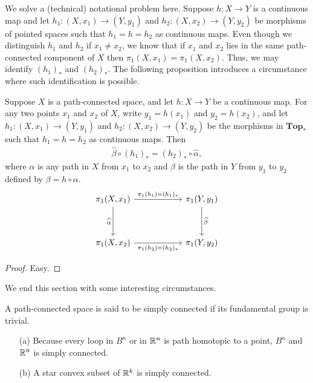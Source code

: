 We solve a (technical) notational problem here.
Suppose $h: X\rightarrow Y$ is a continuous map and let $h_1: (X, x_1)\rightarrow (Y, y_1)$ and $h_2: (X, x_2)\rightarrow (Y, y_2)$ be morphisms of pointed spaces such that $h_1=h=h_2$ as continuous maps.
Even though we distinguish $h_1$ and $h_2$ if $x_1\neq x_2$, we know that if $x_1$ and $x_2$ lies in the same path-connected component of $X$ then $\pi_1(X, x_1)=\pi_1(X, x_2)$.
Thus, we may identify $(h_1)_*$ and $(h_2)_*$.
The following proposition introduces a circumstance where such identification is possible.
\begin{prop}\label{Independence to base points}
    Suppose $X$ is a path-connected space, and let $h: X\rightarrow Y$ be a continuous map.
    For any two points $x_1$ and $x_2$ of $X$, write $y_1=h(x_1)$ and $y_2=h(x_2)$, and let $h_1: (X, x_1)\rightarrow(Y, y_1)$ and $h_2: (X, x_2)\rightarrow (Y, y_2)$ be the morphisms in $\textbf{Top}_*$ such that $h_1=h=h_2$ as continuous maps.
    Then
    \begin{align*}
        \widehat\beta \circ (h_1)_* = (h_2)_* \circ \widehat\alpha,
    \end{align*}
    where $\alpha$ is any path in $X$ from $x_1$ to $x_2$ and $\beta$ is the path in $Y$ from $y_1$ to $y_2$ defined by $\beta=h\circ\alpha$.
    \begin{equation*}
    \begin{tikzcd}[row sep=1.2cm, column sep=2.0cm]
        \pi_1(X, x_1)\arrow[r, "\pi_1(h_1)=(h_1)_*"]
        \arrow[d, "\widehat\alpha"']
        &
        \pi_1(Y, y_1)
        \arrow[d, "\widehat\beta"]
        \\
        \pi_1(X, x_2)\arrow[r, "\pi_1(h_2)=(h_2)_*"']
        &
        \pi_1(Y, y_2)
    \end{tikzcd}
    \end{equation*}
\end{prop}
\begin{proof}
    Easy.
\end{proof}

We end this section with some interesting circumstances.
\begin{defi}
    A path-connected space is said to be simply connected if its fundamental group is trivial.
\end{defi}
\begin{exmp}
    \begin{enumerate}
        \item[(a)]
        {
            Because every loop in $B^n$ or in ${\mathbb{R}}^n$ is path homotopic to a point, $B^n$ and ${\mathbb{R}}^n$ is simply connected.
        }
        \item[(b)]
        {
            A star convex subset of ${\mathbb{R}}^k$ is simply connected.
        }
    \end{enumerate}
\end{exmp}

